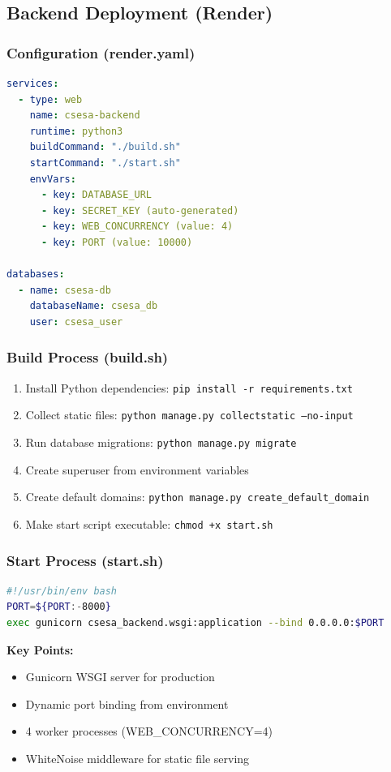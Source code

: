 \documentclass[11pt,a4paper]{article}
\begin{document}
\subsection{Backend Deployment (Render)}

\subsubsection{Configuration (render.yaml)}
\begin{lstlisting}[language=YAML]
services:
  - type: web
    name: csesa-backend
    runtime: python3
    buildCommand: "./build.sh"
    startCommand: "./start.sh"
    envVars:
      - key: DATABASE_URL
      - key: SECRET_KEY (auto-generated)
      - key: WEB_CONCURRENCY (value: 4)
      - key: PORT (value: 10000)

databases:
  - name: csesa-db
    databaseName: csesa_db
    user: csesa_user
\end{lstlisting}

\subsubsection{Build Process (build.sh)}
\begin{enumerate}[leftmargin=*]
    \item Install Python dependencies: \texttt{pip install -r requirements.txt}
    \item Collect static files: \texttt{python manage.py collectstatic --no-input}
    \item Run database migrations: \texttt{python manage.py migrate}
    \item Create superuser from environment variables
    \item Create default domains: \texttt{python manage.py create\_default\_domain}
    \item Make start script executable: \texttt{chmod +x start.sh}
\end{enumerate}

\subsubsection{Start Process (start.sh)}
\begin{lstlisting}[language=bash]
#!/usr/bin/env bash
PORT=${PORT:-8000}
exec gunicorn csesa_backend.wsgi:application --bind 0.0.0.0:$PORT
\end{lstlisting}

\textbf{Key Points:}
\begin{itemize}[leftmargin=*]
    \item Gunicorn WSGI server for production
    \item Dynamic port binding from environment
    \item 4 worker processes (WEB\_CONCURRENCY=4)
    \item WhiteNoise middleware for static file serving
\end{itemize}
\end{document}
